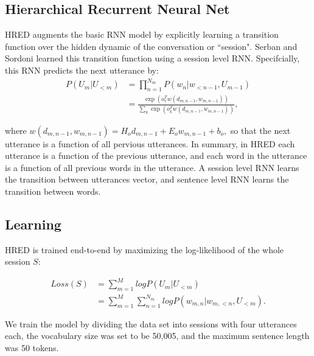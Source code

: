 \subsection{Hierarchical Recurrent Neural Net}

HRED augments the basic RNN model by explicitly learning a transition function over the hidden dynamic of the conversation or  ``session". Serban and Sordoni learned this transition function using a session level RNN. Specifcially, this RNN predicts the next utterance by:
    \begin{align*}
        P(U_m|U_{<m}) &= \prod_{n=1}^{N_m} P(w_n | w_{<n-1}, U_{m-1}) \\
                      &= \frac{\exp(o_{v}^T w(d_{m,n-1}, w_{{m,n-1}}))}{\sum_{k} \exp(o_{k}^Tw(d_{m,n-1}, w_{m,n-1}))},
    \end{align*}

where $w(d_{m,n-1}, w_{m,n-1}) = H_o d_{m,n-1} + E_o w_{m,n-1} + b_o,$ so that the next utterance is a function of all pervious utterances. In summary, in HRED each utterance is a function of the previous utterance, and each word in the utterance is a function of all previous words in the utterance. A session level RNN learns the transition between utterances vector, and sentence level RNN learns the transition between words. 

\subsection{Learning}

HRED is trained end-to-end by maximizing the log-likelihood of the whole session $S$:

    \begin{align*}
        Loss(S) &= \sum_{m=1}^M log P(U_m|U_{<m}) \\
                &= \sum_{m=1}^M \sum_{n=1}^{N_m} log P(w_{m,n} | w_{m,<n}, U_{<m}).
    \end{align*}

We train the model by dividing the data set into sessions with four utterances each, the vocabulary size was set to be 50,005, and the maximum sentence length was 50 tokens.



































